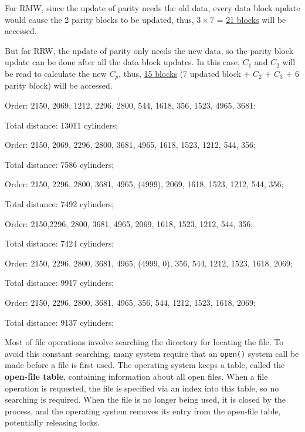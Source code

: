 \documentclass[11pt]{homework}
\begin{document}
\begin{alphaparts}
\begin{description}[
            leftmargin = !,
            labelwidth = \widthof{\bfseries RAID-5},
            topsep = 0pt,
            itemsep = 0pt,
            parsep = 0pt
        ]
            For RMW, since the update of parity needs the old data, every data block update would
            cause the 2 parity blocks to be updated, thus, $3\times 7$ = \underline{21 blocks} will
            be accessed.

            But for RRW, the update of parity only needs the new data, so the parity block update
            can be done after all the data block updates. In this case, $C_1$ and $C_2$ will be read
            to calculate the new $C_p$, thus, \underline{15 blocks} (7 updated block + $C_2$ + $C_3$
            + 6 parity block) will be accessed.
    \end{description}
\end{alphaparts}
\question
\begin{description}[
        leftmargin = !,
        labelwidth = \widthof{\bfseries C-SCAN},
        topsep = 0pt,
        itemsep = 0pt,
        parsep = 0pt
    ]
    \item[FCFS] Order: 2150, 2069, 1212, 2296, 2800, 544, 1618, 356, 1523, 4965, 3681;

        Total distance: 13011 cylinders;

    \item[SSTF] Order: 2150, 2069, 2296, 2800, 3681, 4965, 1618, 1523, 1212, 544, 356;

        Total distance: 7586 cylinders;

    \item[SCAN] Order: 2150, 2296, 2800, 3681, 4965, (4999), 2069, 1618, 1523, 1212, 544, 356;

        Total distance: 7492 cylinders;

    \item[LOOK] Order: 2150,2296, 2800, 3681, 4965, 2069, 1618, 1523, 1212, 544, 356;

        Total distance: 7424 cylinders;

    \item[C-SCAN] Order: 2150, 2296, 2800, 3681, 4965, (4999, 0), 356, 544, 1212, 1523, 1618, 2069;

        Total distance: 9917 cylinders;

    \item[C-LOOK] Order: 2150, 2296, 2800, 3681, 4965, 356, 544, 1212, 1523, 1618, 2069;

        Total distance: 9137 cylinders;
\end{description}
\question
Most of file operations involve searching the directory for locating the file. To avoid this
constant searching, many system require that an \texttt{open()} system call be made before a file
is first used. The operating system keeps a table, called the \textbf{open-file table}, containing
information about all open files. When a file operation is requested, the file is specified via an
index into this table, so no searching is required. When the file is no longer being used, it is
closed by the process, and the operating system removes its entry from the open-file table,
potentially releasing locks.
\end{document}
